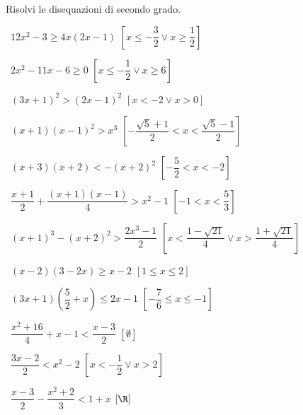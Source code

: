 % 
% 
% 

\begin{esercizio}[*]
 \label{ese:4.17}
Risolvi le disequazioni di secondo grado.
\vspace{\dy}
 \begin{enumeratea}
 \item~\(12x^2-3\ge 4x(2x-1)\) 
  \hfill \(\left[x\le -\dfrac 3 2\vee x\ge \dfrac 1 2\right]\)
 \item~\(2x^2-11x-6\ge 0\) 
  \hfill \(\left[x\le -\dfrac 1 2\vee x\ge 6\right]\)
 \item~\((3x+1)^2>(2x-1)^2\) 
  \hfill \(\left[x<-2\vee x>0\right]\)
 \item~\((x+1)(x-1)^2>x^3\) 
  \hfill \(\left[-\dfrac{\sqrt 5+1} 2<x<\dfrac{\sqrt 5-1} 2\right]\)
 \item~\((x+3)(x+2)<-(x+2)^2\)
  \hfill \(\left[-\dfrac 5 2<x<-2\right]\)
 \item~\(\dfrac{x+1} 2+\dfrac{(x+1)(x-1)} 4>x^2-1\)
  \hfill \(\left[-1<x<\dfrac 5 3\right]\)
 \item~\((x+1)^3-(x+2)^2>\dfrac{2x^3-1} 2\)
  \hfill \(\left[x<\dfrac{1-\sqrt{21}} 4\vee x>\dfrac{1+\sqrt{21}} 4\right]\)
 \item~\((x-2)(3-2x)\ge x-2\)
  \hfill \(\left[1\le x\le 2\right]\)
 \item~\((3x+1)\left(\dfrac 5 2+x\right)\le 2x-1\)
  \hfill \(\left[-\dfrac 7 6\le x\le -1\right]\)
 \item~\(\dfrac{x^2+16} 4+x-1<\dfrac{x-3} 2\)
  \hfill \(\left[\emptyset\right]\)
 \item~\(\dfrac{3x-2} 2<x^2-2\)
  \hfill \(\left[x<-\dfrac 1 2\vee x>2\right]\)
 \item~\(\dfrac{x-3} 2-\dfrac{x^2+2} 3<1+x\)
  \hfill \(\left[\R\right]\)
 \end{enumeratea}
\end{esercizio}

